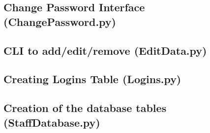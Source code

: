 \begin{landscape}
\begin{scriptsize}
\newpage
\subsection{Change Password Interface (ChangePassword.py)}\label{CP}

\newpage
\subsection{CLI to add/edit/remove (EditData.py)}\label{EditData}

\newpage
\subsection{Creating Logins Table (Logins.py)}\label{MMM}


\newpage
\subsection{Creation of the database tables (StaffDatabase.py)}\label{SDB}

\end{scriptsize}

\end{landscape}
